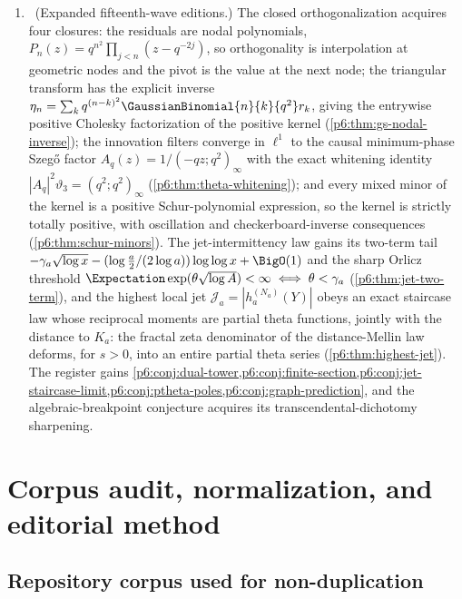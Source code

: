 \documentclass[11pt,oneside]{article}
\numberwithin{equation}{section}
\theoremstyle{definition}
\theoremstyle{remark}
\begin{document}
\begin{enumerate}
\item \newflag\ (Expanded fifteenth-wave editions.)  The closed
orthogonalization acquires four closures: the residuals are nodal
polynomials, $P_n(z)=q^{n^2}\prod_{j<n}(z-q^{-2j})$, so orthogonality is
interpolation at geometric nodes and the pivot is the value at the next
node; the triangular transform has the explicit inverse
$\eta_n=\sum_kq^{(n-k)^2}\GaussianBinomial{n}{k}{q^2}r_k$, giving the entrywise
positive Cholesky factorization of the positive kernel
(\cref{p6:thm:gs-nodal-inverse}); the innovation filters converge in
$\ell^1$ to the causal minimum-phase Szeg\H{o} factor
$A_q(z)=1/(-qz;q^2)_\infty$ with the exact whitening identity
$|A_q|^2\vartheta_3=(q^2;q^2)_\infty$
(\cref{p6:thm:theta-whitening}); and every mixed minor of the kernel is a
positive Schur-polynomial expression, so the kernel is strictly totally
positive, with oscillation and checkerboard-inverse consequences
(\cref{p6:thm:schur-minors}).  The jet-intermittency law gains its
two-term tail
$-\gamma_a\sqrt{\log x}-(\log\tfrac a2/(2\log a))\log\log x+\BigO(1)$ and
the sharp Orlicz threshold
$\Expectation\exp(\theta\sqrt{\log A})<\infty\iff\theta<\gamma_a$
(\cref{p6:thm:jet-two-term}), and the highest local jet
$\mathcal J_a=|h_a^{(N_a)}(Y)|$ obeys an exact staircase law whose
reciprocal moments are partial theta functions, jointly with the distance
to $K_a$: the fractal zeta denominator of the distance-Mellin law
deforms, for $s>0$, into an entire partial theta series
(\cref{p6:thm:highest-jet}).  The register gains
\cref{p6:conj:dual-tower,p6:conj:finite-section,p6:conj:jet-staircase-limit,p6:conj:ptheta-poles,p6:conj:graph-prediction},
and the algebraic-breakpoint conjecture acquires its
transcendental-dichotomy sharpening.
\end{enumerate}

\section{Corpus audit, normalization, and editorial method}

\subsection{Repository corpus used for non-duplication}
\end{document}
